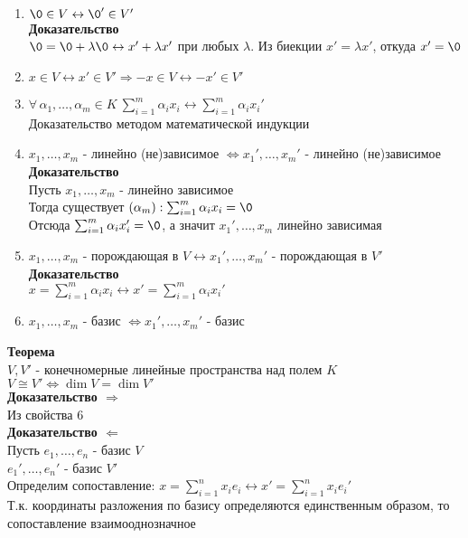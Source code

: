\documentclass[12pt]{article}
\begin{document}
\begin{enumerate}
    \item $\0 \in V \leftrightarrow \0' \in V'$\\
    \textbf{Доказательство}\\
    $\0 = \0 + \lambda\0 \leftrightarrow x' + \lambda x'$ при любых $\lambda$. Из биекции $x' = \lambda x'$, откуда $x' = \0$
    \item $x \in V \leftrightarrow x' \in V' \Rightarrow -x \in V \leftrightarrow -x' \in V'$
    \item $\forall\, \alpha_1,\ldots, \alpha_m \in K\ \sum_{i=1}^m \alpha_i x_i \leftrightarrow \sum_{i=1}^m \alpha_i x_i'$\\
    Доказательство методом математической индукции
    \item $x_1,\ldots, x_m$ - линейно (не)зависимое $\Leftrightarrow x_1',\ldots,x_m'$ - линейно (не)зависимое\\
    \textbf{Доказательство}\\
    Пусть $x_1,\ldots, x_m$ - линейно зависимое\\
    Тогда существует $(\alpha_m): \sum_{i=1}^m \alpha_i x_i = \0$\\
    Отсюда $\sum_{i=1}^m \alpha_i x_i' = \0$, а значит $x_1',\ldots,x_m$ линейно зависимая
    \item $x_1,\ldots,x_m$ - порождающая в $V \leftrightarrow x_1',\ldots,x_m'$ - порождающая в $V'$\\
    \textbf{Доказательство}\\
    $x = \sum_{i=1}^m \alpha_i x_i \leftrightarrow x' = \sum_{i=1}^m\alpha_i x_i'$
    \item $x_1,\ldots, x_m$ - базис $\Leftrightarrow x_1',\ldots,x_m'$ - базис
\end{enumerate}
\textbf{Теорема}\\
$V, V'$ - конечномерные линейные пространства над полем $K$\\
$V \cong V' \Leftrightarrow \dim V = \dim V'$\\
\textbf{Доказательство $\Rightarrow$}\\
Из свойства 6\\
\textbf{Доказательство $\Leftarrow$}\\
Пусть $e_1, \ldots, e_n$ - базис $V$\\
$e_1', \ldots, e_n'$ - базис $V'$\\
Определим сопоставление: $x = \sum_{i=1}^n x_i e_i \leftrightarrow x' = \sum_{i=1}^n x_i e_i'$\\
Т.к. координаты разложения по базису определяются единственным образом, то сопоставление взаимооднозначное\\
\end{document}
